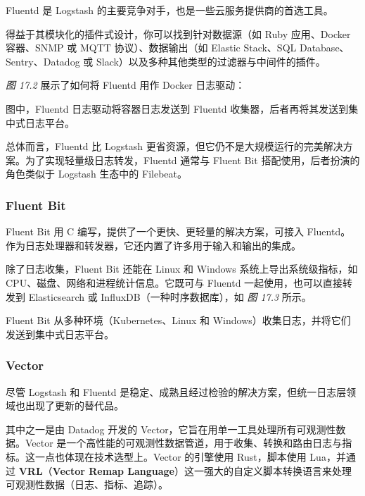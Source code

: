 \label{idx:1866}
Fluentd 是 Logstash 的主要竞争对手，也是一些云服务提供商的首选工具。

\label{idx:1867}
得益于其模块化的插件式设计，你可以找到针对数据源（如 Ruby 应用、Docker 容器、SNMP 或 MQTT 协议）、数据输出（如 Elastic Stack、SQL Database、Sentry、Datadog 或 Slack）以及多种其他类型的过滤器与中间件的插件。

\emph{图 17.2} 展示了如何将 Fluentd 用作 Docker 日志驱动：


图中，Fluentd 日志驱动将容器日志发送到 Fluentd 收集器，后者再将其发送到集中式日志平台。

\label{idx:1868}
\label{idx:1869}
总体而言，Fluentd 比 Logstash 更省资源，但它仍不是大规模运行的完美解决方案。为了实现轻量级日志转发，Fluentd 通常与 Fluent Bit 搭配使用，后者扮演的角色类似于 Logstash 生态中的 Filebeat。

\subsubsection{Fluent Bit}

\label{idx:1870}
Fluent Bit 用 C 编写，提供了一个更快、更轻量的解决方案，可接入 Fluentd。作为日志处理器和转发器，它还内置了许多用于输入和输出的集成。

\label{idx:1871}
除了日志收集，Fluent Bit 还能在 Linux 和 Windows 系统上导出系统级指标，如 CPU、磁盘、网络和进程统计信息。它既可与 Fluentd 一起使用，也可以直接转发到 Elasticsearch 或 InfluxDB（一种时序数据库），如 \emph{图 17.3} 所示。


Fluent Bit 从多种环境（Kubernetes、Linux 和 Windows）收集日志，并将它们发送到集中式日志平台。

\subsubsection{Vector}

尽管 Logstash 和 Fluentd 是稳定、成熟且经过检验的解决方案，但统一日志层领域也出现了更新的替代品。

\label{idx:1872}
\label{idx:1873}
\label{idx:1874}
其中之一是由 Datadog 开发的 Vector，它旨在用单一工具处理所有可观测性数据。Vector 是一个高性能的可观测性数据管道，用于收集、转换和路由日志与指标。这一点也体现在技术选型上。Vector 的引擎使用 Rust，脚本使用 Lua，并通过 \textbf{VRL}（\textbf{Vector Remap Language}）这一强大的自定义脚本转换语言来处理可观测性数据（日志、指标、追踪）。

